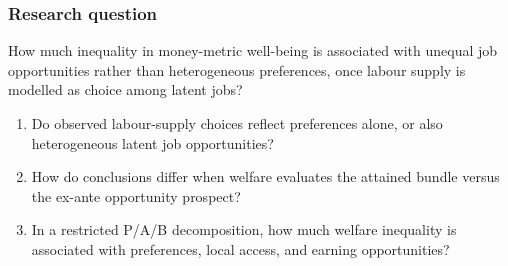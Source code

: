 \documentclass[10pt,aspectratio=169]{beamer}
\begin{document}
\begin{frame}
\frametitle{Research question}
\vfill
\begin{block}{}
How much inequality in money-metric well-being is associated with unequal job
opportunities rather than heterogeneous preferences, once labour supply is
modelled as choice among latent jobs?
\end{block}
\vfill
\begin{enumerate}\itemsep0.6em
  \item Do observed labour-supply choices reflect preferences alone, or also
        heterogeneous latent job opportunities?
  \item How do conclusions differ when welfare evaluates the attained bundle
        versus the ex-ante opportunity prospect?
  \item In a restricted P/A/B decomposition, how much welfare inequality is
        associated with preferences, local access, and earning opportunities?
\end{enumerate}
\vfill
{}
\end{frame}
\end{document}
